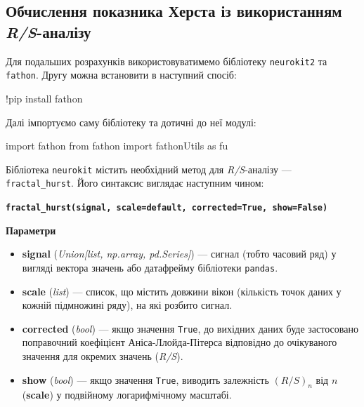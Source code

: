 \documentclass[
  letterpaper,
]{report}
\newenvironment{Shaded}{\begin{snugshade}}{\end{snugshade}}
\newcommand{\ImportTok}[1]{\textcolor[rgb]{0.00,0.46,0.62}{#1}}
\newcommand{\NormalTok}[1]{\textcolor[rgb]{0.00,0.23,0.31}{#1}}
\newcommand{\OperatorTok}[1]{\textcolor[rgb]{0.37,0.37,0.37}{#1}}
\providecommand{\tightlist}{%
  \setlength{\itemsep}{0pt}\setlength{\parskip}{0pt}}\usepackage{longtable,booktabs,array}
\begin{document}
\hypertarget{ux43eux431ux447ux438ux441ux43bux435ux43dux43dux44f-ux43fux43eux43aux430ux437ux43dux438ux43aux430-ux445ux435ux440ux441ux442ux430-ux456ux437-ux432ux438ux43aux43eux440ux438ux441ux442ux430ux43dux43dux44fux43c-rs-ux430ux43dux430ux43bux456ux437ux443}{%
\subsection{\texorpdfstring{Обчислення показника Херста із використанням
\emph{R/S}-аналізу}{Обчислення показника Херста із використанням R/S-аналізу}}\label{ux43eux431ux447ux438ux441ux43bux435ux43dux43dux44f-ux43fux43eux43aux430ux437ux43dux438ux43aux430-ux445ux435ux440ux441ux442ux430-ux456ux437-ux432ux438ux43aux43eux440ux438ux441ux442ux430ux43dux43dux44fux43c-rs-ux430ux43dux430ux43bux456ux437ux443}}

Для подальших розрахунків використовуватимемо бібліотеку
\texttt{neurokit2} та \texttt{fathon}. Другу можна встановити в
наступний спосіб:

\begin{Shaded}
\begin{Highlighting}[]
\OperatorTok{!}\NormalTok{pip install fathon}
\end{Highlighting}
\end{Shaded}

Далі імпортуємо саму бібліотеку та дотичні до неї модулі:

\begin{Shaded}
\begin{Highlighting}[]
\ImportTok{import}\NormalTok{ fathon}
\ImportTok{from}\NormalTok{ fathon }\ImportTok{import}\NormalTok{ fathonUtils }\ImportTok{as}\NormalTok{ fu}
\end{Highlighting}
\end{Shaded}

Бібліотека \texttt{neurokit} містить необхідний метод для
\emph{R/S}-аналізу --- \texttt{fractal\_hurst}. Його синтаксис виглядає
наступним чином:

\textbf{\texttt{fractal\_hurst(signal,\ scale=\textquotesingle{}default\textquotesingle{},\ corrected=True,\ show=False)}}

\textbf{Параметри}

\begin{itemize}
\tightlist
\item
  \textbf{signal} (\emph{Union{[}list, np.array, pd.Series{]}}) ---
  сигнал (тобто часовий ряд) у вигляді вектора значень або датафрейму
  бібліотеки \texttt{pandas}.
\item
  \textbf{scale} (\emph{list}) --- список, що містить довжини вікон
  (кількість точок даних у кожній підмножині ряду), на які розбито
  сигнал.
\item
  \textbf{corrected} (\emph{bool}) --- якщо значення \texttt{True}, до
  вихідних даних буде застосовано поправочний коефіцієнт
  Аніса-Ллойда-Пітерса відповідно до очікуваного значення для окремих
  значень (\emph{R/S}).
\item
  \textbf{show} (\emph{bool}) --- якщо значення \texttt{True}, виводить
  залежність \((R/S)_n\) від \(n\) (\textbf{scale}) у подвійному
  логарифмічному масштабі.
\end{itemize}
\end{document}
